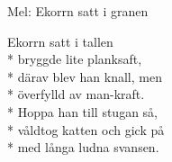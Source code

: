 \pagestyle{Barnförbjudet}
\begin{SongText}
    \begin{SongInfo}
        Mel: Ekorrn satt i granen
    \end{SongInfo}
    \begin{SongVerse}
        Ekorrn satt i tallen\\*%
        bryggde lite planksaft,\\*%
        därav blev han knall, men\\*%
        överfylld av man-kraft.\\*%
        Hoppa han till stugan så, \\*%
        våldtog katten och gick på\\*%
        med långa ludna svansen.
    \end{SongVerse}
\end{SongText}
